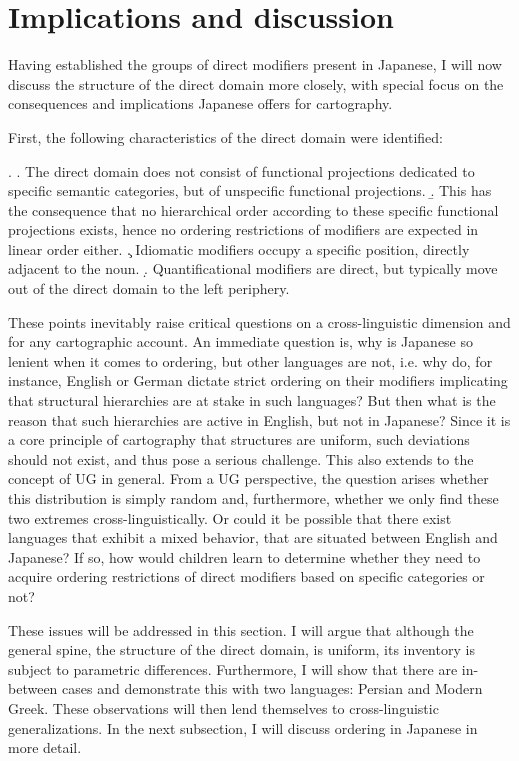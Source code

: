 \documentclass [output=book,colorlinks,citecolor=brown]{langscibook}
\begin{document}
\section{Implications and discussion} \label{discussiondirect}

Having established the groups of direct modifiers present in Japanese, I will now discuss the structure of the direct domain more closely, with special focus on the consequences and implications Japanese offers for cartography.

First, the following characteristics of the direct domain were identified:

\ex. \a. The direct domain does not consist of functional projections dedicated to specific semantic categories, but of unspecific functional projections.
\b. This has the consequence that no hierarchical order according to these specific functional projections exists, hence no ordering restrictions of modifiers are expected in linear order either.
\c. Idiomatic modifiers occupy a specific position, directly adjacent to the noun.
\d. Quantificational modifiers are direct, but typically move out of the direct domain to the left periphery.

These points inevitably raise critical questions on a cross-linguistic dimension and for any cartographic account. An immediate question is, why is Japanese so lenient when it comes to ordering, but other languages are not, i.e. why do, for instance, English or German dictate strict ordering on their modifiers implicating that structural hierarchies are at stake in such languages? But then what is the reason that such hierarchies are active in English, but not in Japanese? Since it is a core principle of cartography that structures are uniform, such deviations should not exist, and thus pose a serious challenge. This also extends to the concept of UG in general. From a UG perspective, the question arises whether this distribution is simply random and, furthermore, whether we only find these two extremes cross-linguistically. Or could it be possible that there exist languages that exhibit a mixed behavior, that are situated between English and Japanese? If so, how would children learn to determine whether they need to acquire ordering restrictions of direct modifiers based on specific categories or not?

These issues will be addressed in this section. I will argue that although the general spine, the structure of the direct domain, is uniform, its inventory is subject to parametric differences. Furthermore, I will show that there are in-between cases and demonstrate this with two languages: Persian and Modern Greek. These observations will then lend themselves to cross-linguistic generalizations. In the next subsection, I will discuss ordering in Japanese in more detail.
\end{document}
